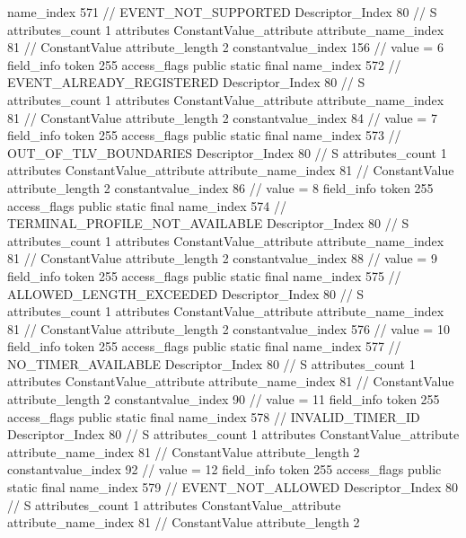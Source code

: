 {{{{{				name_index	571		// EVENT_NOT_SUPPORTED
				Descriptor_Index	80		// S
				attributes_count	1
				attributes {
				ConstantValue_attribute {
					attribute_name_index	81		// ConstantValue
					attribute_length	2
					constantvalue_index	156		// value = 6
				}
				}
			}
			field_info {
				token	255
				access_flags	public static final
				name_index	572		// EVENT_ALREADY_REGISTERED
				Descriptor_Index	80		// S
				attributes_count	1
				attributes {
				ConstantValue_attribute {
					attribute_name_index	81		// ConstantValue
					attribute_length	2
					constantvalue_index	84		// value = 7
				}
				}
			}
			field_info {
				token	255
				access_flags	public static final
				name_index	573		// OUT_OF_TLV_BOUNDARIES
				Descriptor_Index	80		// S
				attributes_count	1
				attributes {
				ConstantValue_attribute {
					attribute_name_index	81		// ConstantValue
					attribute_length	2
					constantvalue_index	86		// value = 8
				}
				}
			}
			field_info {
				token	255
				access_flags	public static final
				name_index	574		// TERMINAL_PROFILE_NOT_AVAILABLE
				Descriptor_Index	80		// S
				attributes_count	1
				attributes {
				ConstantValue_attribute {
					attribute_name_index	81		// ConstantValue
					attribute_length	2
					constantvalue_index	88		// value = 9
				}
				}
			}
			field_info {
				token	255
				access_flags	public static final
				name_index	575		// ALLOWED_LENGTH_EXCEEDED
				Descriptor_Index	80		// S
				attributes_count	1
				attributes {
				ConstantValue_attribute {
					attribute_name_index	81		// ConstantValue
					attribute_length	2
					constantvalue_index	576		// value = 10
				}
				}
			}
			field_info {
				token	255
				access_flags	public static final
				name_index	577		// NO_TIMER_AVAILABLE
				Descriptor_Index	80		// S
				attributes_count	1
				attributes {
				ConstantValue_attribute {
					attribute_name_index	81		// ConstantValue
					attribute_length	2
					constantvalue_index	90		// value = 11
				}
				}
			}
			field_info {
				token	255
				access_flags	public static final
				name_index	578		// INVALID_TIMER_ID
				Descriptor_Index	80		// S
				attributes_count	1
				attributes {
				ConstantValue_attribute {
					attribute_name_index	81		// ConstantValue
					attribute_length	2
					constantvalue_index	92		// value = 12
				}
				}
			}
			field_info {
				token	255
				access_flags	public static final
				name_index	579		// EVENT_NOT_ALLOWED
				Descriptor_Index	80		// S
				attributes_count	1
				attributes {
				ConstantValue_attribute {
					attribute_name_index	81		// ConstantValue
					attribute_length	2
}}}}}}}
